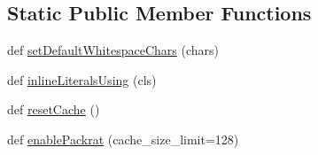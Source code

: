 \subsection*{Static Public Member Functions}
\begin{DoxyCompactItemize}
\item 
def \hyperlink{classsetuptools_1_1__vendor_1_1pyparsing_1_1ParserElement_ace898842e0db5a5e509c8842426aab45}{set\+Default\+Whitespace\+Chars} (chars)
\item 
def \hyperlink{classsetuptools_1_1__vendor_1_1pyparsing_1_1ParserElement_ab48c9762534971e65dbb220d20c37990}{inline\+Literals\+Using} (cls)
\item 
def \hyperlink{classsetuptools_1_1__vendor_1_1pyparsing_1_1ParserElement_a8920748bf29370bc65690a1fb9016639}{reset\+Cache} ()
\item 
def \hyperlink{classsetuptools_1_1__vendor_1_1pyparsing_1_1ParserElement_a93ea62f4f71af75efc5d024e262485b6}{enable\+Packrat} (cache\+\_\+size\+\_\+limit=128)
\end{DoxyCompactItemize}
